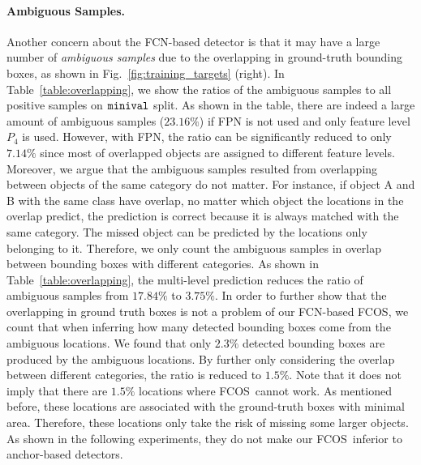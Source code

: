 \documentclass[10pt,twocolumn,letterpaper]{article}
\renewcommand{\texttt}[1]{ $ {{\tt #1} } $}
\newcommand{\1}{{\mathbbm{1}}}           %
\def\Ours{{FCNDet}\xspace}
\def\Ours{{FCOS}\xspace}
\begin{document}
\paragraph{Ambiguous Samples.} Another concern about the FCN-based detector is that it may have a large number of \emph{ambiguous samples} due to the overlapping in ground-truth bounding boxes, as shown in Fig.~\ref{fig:training_targets} (right). In Table~\ref{table:overlapping}, we show the ratios of the ambiguous samples to all positive samples on \texttt{minival} split. As shown in the table, there are indeed a large amount of ambiguous samples ($23.16\%$) if FPN is not used and only feature level $P_4$ is used. However, with FPN, the ratio can be significantly reduced to only $7.14\%$ since most of overlapped objects are assigned to different feature levels. Moreover, we argue that the ambiguous samples resulted from overlapping between objects of the same category do not matter. For instance, if object A and B with the same class have overlap, no matter which object the locations in the overlap predict, the prediction is correct because it is always matched with the same category. The missed object can be predicted by the locations only belonging to it. Therefore, we only count the ambiguous samples in overlap between bounding boxes with different categories. As shown in Table~\ref{table:overlapping}, the multi-level prediction reduces the ratio of ambiguous samples from $17.84\%$ to $3.75\%$. In order to further show that the overlapping in ground truth boxes is not a problem of our FCN-based \Ours, we count that when inferring how many detected bounding boxes come from the ambiguous locations. We found that only $2.3\%$ detected bounding boxes are produced by the ambiguous locations. By further only considering the overlap between different categories, the ratio is reduced to $1.5\%$. Note that it does not imply that there are $1.5\%$ locations where \Ours\ cannot work. As mentioned before, these locations are associated with the ground-truth boxes with minimal area. Therefore, these locations only take the risk of missing some larger objects. As shown in the following experiments, they do not make our \Ours\ inferior to anchor-based detectors.

%
%
%
\end{document}
